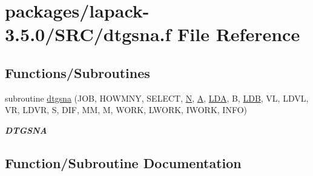 \hypertarget{dtgsna_8f}{}\section{packages/lapack-\/3.5.0/\+S\+R\+C/dtgsna.f File Reference}
\label{dtgsna_8f}
\subsection*{Functions/\+Subroutines}
\begin{DoxyCompactItemize}
\item 
subroutine \hyperlink{dtgsna_8f_a6c1a813b10f49050475ad50fe9fcaea7}{dtgsna} (J\+O\+B, H\+O\+W\+M\+N\+Y, S\+E\+L\+E\+C\+T, \hyperlink{polmisc_8c_a0240ac851181b84ac374872dc5434ee4}{N}, \hyperlink{classA}{A}, \hyperlink{example__user_8c_ae946da542ce0db94dced19b2ecefd1aa}{L\+D\+A}, B, \hyperlink{example__user_8c_a50e90a7104df172b5a89a06c47fcca04}{L\+D\+B}, V\+L, L\+D\+V\+L, V\+R, L\+D\+V\+R, S, D\+I\+F, M\+M, M, W\+O\+R\+K, L\+W\+O\+R\+K, I\+W\+O\+R\+K, I\+N\+F\+O)
\begin{DoxyCompactList}\small\item\em {\bfseries D\+T\+G\+S\+N\+A} \end{DoxyCompactList}\end{DoxyCompactItemize}


\subsection{Function/\+Subroutine Documentation}
\hypertarget{dtgsna_8f_a6c1a813b10f49050475ad50fe9fcaea7}{}
